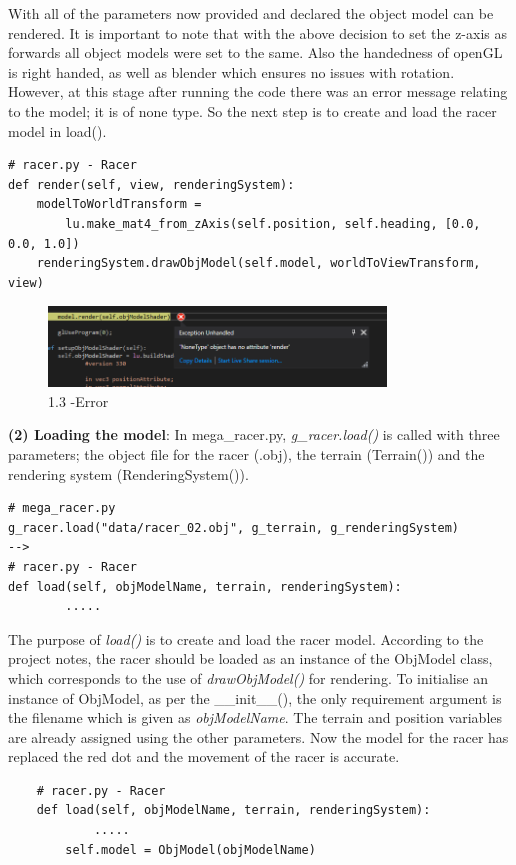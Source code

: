 \documentclass[a4 paper, 12pt]{article}
\begin{document}
With all of the parameters now provided and declared the object model can be rendered. It is important to note that with the above decision to set the z-axis as forwards all object models were set to the same. Also the handedness of openGL is right handed, as well as blender which ensures no issues with rotation. However, at this stage after running the code there was an error message relating to the model; it is of none type. So the next step is to create and load the racer model in load(). 
\begin{lstlisting}
# racer.py - Racer
def render(self, view, renderingSystem):
    modelToWorldTransform = 
        lu.make_mat4_from_zAxis(self.position, self.heading, [0.0, 0.0, 1.0])
    renderingSystem.drawObjModel(self.model, worldToViewTransform, view)
\end{lstlisting}

    \begin{figure} [H]
        \centering
        \includegraphics[width=0.8\textwidth, frame]
            {./images/mega_racer/1.3_a.PNG}
        \caption{1.3 -Error}
    \end{figure}

\textbf{(2) Loading the model}: 
In mega\_racer.py, \textit{g\_racer.load()} is called with three parameters; the object file for the racer (.obj), the terrain (Terrain()) and the rendering system (RenderingSystem()). 
    \begin{lstlisting}
# mega_racer.py
g_racer.load("data/racer_02.obj", g_terrain, g_renderingSystem)
-->
# racer.py - Racer
def load(self, objModelName, terrain, renderingSystem):
        .....    
    \end{lstlisting}

The purpose of \textit{load()} is to create and load the racer model. According to the project notes, the racer should be loaded as an instance of the ObjModel class, which corresponds to the use of \textit{drawObjModel()} for rendering. To initialise an instance of ObjModel, as per the \_\_init\_\_(), the only requirement argument is the filename which is given as \textit{objModelName}. The terrain and position variables are already assigned using the other parameters. Now the model for the racer has replaced the red dot and the movement of the racer is accurate.
    \begin{lstlisting}
    # racer.py - Racer
    def load(self, objModelName, terrain, renderingSystem):
            ..... 
        self.model = ObjModel(objModelName)
    \end{lstlisting}   
\end{document}
